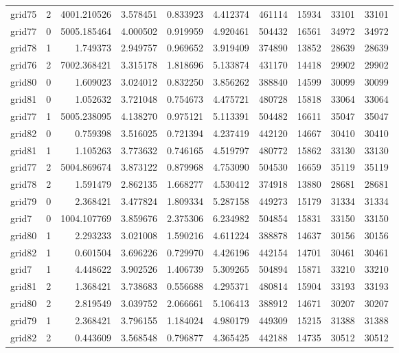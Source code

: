 \begin{longtable}{|l|r|r|r|r|r|r|r|r|r|}
grid75 & 2 & 4001.210526 & 3.578451 & 0.833923 & 4.412374 & 461114 & 15934 & 33101 & 33101 \\
grid77 & 0 & 5005.185464 & 4.000502 & 0.919959 & 4.920461 & 504432 & 16561 & 34972 & 34972 \\
grid78 & 1 & 1.749373 & 2.949757 & 0.969652 & 3.919409 & 374890 & 13852 & 28639 & 28639 \\
grid76 & 2 & 7002.368421 & 3.315178 & 1.818696 & 5.133874 & 431170 & 14418 & 29902 & 29902 \\
grid80 & 0 & 1.609023 & 3.024012 & 0.832250 & 3.856262 & 388840 & 14599 & 30099 & 30099 \\
grid81 & 0 & 1.052632 & 3.721048 & 0.754673 & 4.475721 & 480728 & 15818 & 33064 & 33064 \\
grid77 & 1 & 5005.238095 & 4.138270 & 0.975121 & 5.113391 & 504482 & 16611 & 35047 & 35047 \\
grid82 & 0 & 0.759398 & 3.516025 & 0.721394 & 4.237419 & 442120 & 14667 & 30410 & 30410 \\
grid81 & 1 & 1.105263 & 3.773632 & 0.746165 & 4.519797 & 480772 & 15862 & 33130 & 33130 \\
grid77 & 2 & 5004.869674 & 3.873122 & 0.879968 & 4.753090 & 504530 & 16659 & 35119 & 35119 \\
grid78 & 2 & 1.591479 & 2.862135 & 1.668277 & 4.530412 & 374918 & 13880 & 28681 & 28681 \\
grid79 & 0 & 2.368421 & 3.477824 & 1.809334 & 5.287158 & 449273 & 15179 & 31334 & 31334 \\
grid7 & 0 & 1004.107769 & 3.859676 & 2.375306 & 6.234982 & 504854 & 15831 & 33150 & 33150 \\
grid80 & 1 & 2.293233 & 3.021008 & 1.590216 & 4.611224 & 388878 & 14637 & 30156 & 30156 \\
grid82 & 1 & 0.601504 & 3.696226 & 0.729970 & 4.426196 & 442154 & 14701 & 30461 & 30461 \\
grid7 & 1 & 4.448622 & 3.902526 & 1.406739 & 5.309265 & 504894 & 15871 & 33210 & 33210 \\
grid81 & 2 & 1.368421 & 3.738683 & 0.556688 & 4.295371 & 480814 & 15904 & 33193 & 33193 \\
grid80 & 2 & 2.819549 & 3.039752 & 2.066661 & 5.106413 & 388912 & 14671 & 30207 & 30207 \\
grid79 & 1 & 2.368421 & 3.796155 & 1.184024 & 4.980179 & 449309 & 15215 & 31388 & 31388 \\
grid82 & 2 & 0.443609 & 3.568548 & 0.796877 & 4.365425 & 442188 & 14735 & 30512 & 30512 \\

\end{longtable}
